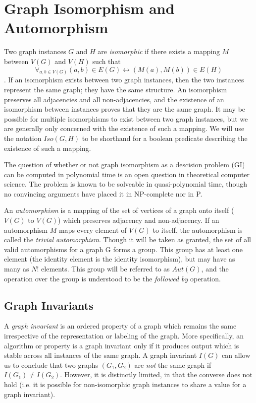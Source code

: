 \documentclass[11pt,a4paper]{report}
\begin{document}
\section{Graph Isomorphism and Automorphism}
Two graph instances $G$ and $H$ are \emph{isomorphic} if there exists a mapping $M$ between $V(G)$ and $V(H)$ such that $$\forall_{a, b \in V(G)} (a, b) \in E(G) \leftrightarrow (M(a), M(b)) \in E(H)$$.
If an isomorphism exists between two graph instances, then the two instances represent the same graph; they have the same structure.
An isomorphism preserves all adjacencies and all non-adjacencies, and the existence of an isomorphism between instances proves that they are the same graph.
It may be possible for multiple isomorphisms to exist between two graph instances, but we are generally only concerned with the existence of such a mapping.
We will use the notation $Iso(G, H)$ to be shorthand for a boolean predicate describing the existence of such a mapping.

The question of whether or not graph isomorphism as a descision problem (GI) can be computed in polynomial time is an open question in theoretical computer science.
The problem is known to be solveable in quasi-polynomial time, though no convincing arguments have placed it in NP-complete nor in P.

An \emph{automorphism} is a mapping of the set of vertices of a graph onto itself ($V(G)$ to $V(G)$) which preserves adjacency and non-adjacency.
If an automorphism $M$ maps every element of $V(G)$ to itself, the automorphism is called the \emph{trivial automorphism}.
Though it will be taken as granted, the set of all valid automorphisms for a graph G forms a group.
This group has at least one element (the identity element is the identity isomorphism), but may have as many as $N!$ elements.
This group will be referred to as $Aut(G)$, and the operation over the group is understood to be the \emph{followed by} operation.

\subsection{Graph Invariants}
A \emph{graph invariant} is an ordered property of a graph which remains the same irrespective of the representation or labeling of the graph.
More specifically, an algorithm or property is a graph invariant only if it produces output which is stable across all instances of the same graph.
A graph invariant $I(G)$ can allow us to conclude that two graphs $(G_1, G_2)$ are \emph{not} the same graph if $I(G_1) \neq I(G_2)$.
However, it is distinctly limited, in that the converse does not hold (i.e. it is possible for non-isomorphic graph instances to share a value for a graph invariant).
\end{document}
